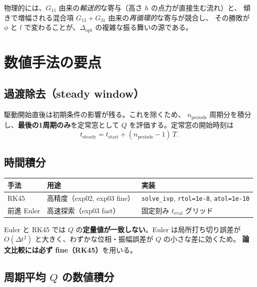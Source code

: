 \documentclass[11pt,a4paper]{article}
\newcommand{\Dopt}{\Delta_{\mathrm{opt}}}
\begin{document}
物理的には、$G_{11}$ 由来の\emph{輸送的}な寄与（高さ $h$ の点力が直接生む流れ）と、
傾きで増幅される混合項 $G_{13}+G_{31}$ 由来の\emph{再循環的}な寄与が競合し、
その勝敗が $\phi$ と $l$ で変わることが、$\Dopt$ の複雑な振る舞いの源である。

\section{数値手法の要点}

\subsection{過渡除去（steady window）}

駆動開始直後は初期条件の影響が残る。これを除くため、
$n_{\mathrm{periods}}$ 周期分を積分し、\textbf{最後の1周期のみ}を定常窓として
$Q$ を評価する。定常窓の開始時刻は
\begin{equation}
t_{\mathrm{steady}}=t_{\mathrm{start}}+(n_{\mathrm{periods}}-1)\,T.
\end{equation}

\subsection{時間積分}

\begin{table}[h]
\centering\small
\begin{tabularx}{\linewidth}{l X l}
\toprule
手法 & 用途 & 実装 \\
\midrule
RK45 & 高精度（exp02, exp03 fine） &
\texttt{solve\_ivp}, \texttt{rtol=1e-8}, \texttt{atol=1e-10} \\
前進 Euler & 高速探索（exp03 fast） & 固定刻み $t_{\mathrm{eval}}$ グリッド \\
\bottomrule
\end{tabularx}
\end{table}

\begin{warnbox}
Euler と RK45 では $Q$ の\textbf{定量値が一致しない}。Euler は局所打ち切り誤差が
$O(\Delta t^2)$ と大きく、わずかな位相・振幅誤差が $Q$ の小さな差に効くため。
\textbf{論文比較には必ず fine（RK45）}を用いる。
\end{warnbox}

\subsection{周期平均 $Q$ の数値積分}
\end{document}
